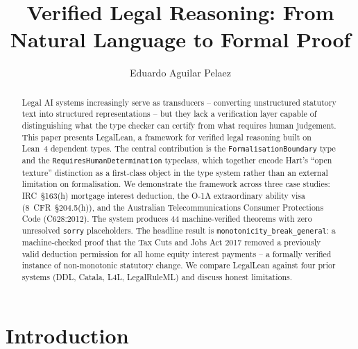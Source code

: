 \documentclass[runningheads]{llncs}
\begin{document}
\title{Verified Legal Reasoning: From Natural Language to Formal Proof}


\author{Eduardo Aguilar Pelaez}



\maketitle

\begin{abstract}
Legal AI systems increasingly serve as transducers -- converting unstructured
statutory text into structured representations -- but they lack a verification
layer capable of distinguishing what the type checker can certify from what
requires human judgement. This paper presents LegalLean, a framework for
verified legal reasoning built on Lean~4 dependent types. The central
contribution is the \texttt{FormalisationBoundary} type and the
\texttt{RequiresHumanDetermination} typeclass, which together encode Hart's
``open texture'' distinction as a first-class object in the type system rather
than an external limitation on formalisation. We demonstrate the framework
across three case studies: IRC~\S163(h) mortgage interest deduction, the O-1A
extraordinary ability visa (8~CFR~\S204.5(h)), and the Australian
Telecommunications Consumer Protections Code (C628:2012). The system produces
44 machine-verified theorems with zero unresolved \texttt{sorry} placeholders.
The headline result is \texttt{monotonicity\_break\_general}: a machine-checked
proof that the Tax Cuts and Jobs Act 2017 removed a previously valid deduction
permission for all home equity interest payments -- a formally verified instance
of non-monotonic statutory change. We compare LegalLean against four prior
systems (DDL, Catala, L4L, LegalRuleML) and discuss honest limitations.

\end{abstract}

\section{Introduction}
\end{document}
